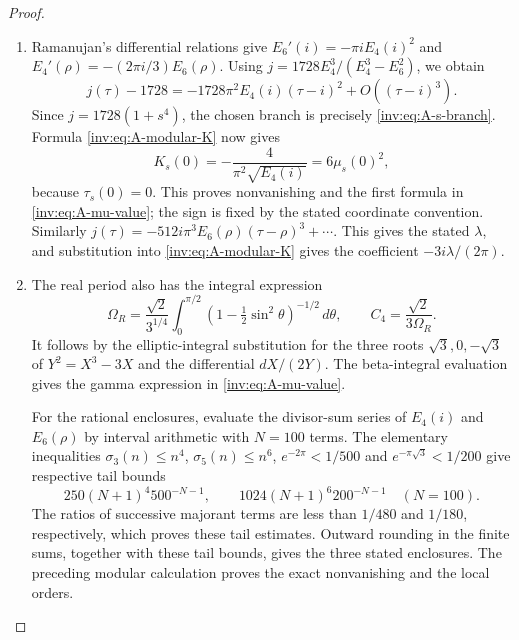 \begin{proof}
\begin{enumerate}[label=\arabic*.,leftmargin=*]
\item Ramanujan's differential relations give
$E_6'(i)=-\pi i E_4(i)^2$ and
$E_4'(\rho)=-(2\pi i/3)E_6(\rho)$.
Using $j=1728E_4^3/(E_4^3-E_6^2)$, we obtain
\[
j(\tau)-1728=-1728\pi^2E_4(i)(\tau-i)^2+O((\tau-i)^3).
\]
Since $j=1728(1+s^4)$, the chosen branch is precisely
\eqref{inv:eq:A-s-branch}.  Formula \eqref{inv:eq:A-modular-K} now gives
\[
K_s(0)=-\frac4{\pi^2\sqrt{E_4(i)}}=6\mu_s(0)^2,
\]
because $\tau_s(0)=0$.  This proves nonvanishing and the first
formula in \eqref{inv:eq:A-mu-value}; the sign is fixed by the stated
coordinate convention.  Similarly
$j(\tau)=-512i\pi^3E_6(\rho)(\tau-\rho)^3+\cdots$.
This gives the stated $\lambda$, and substitution into
\eqref{inv:eq:A-modular-K} gives the coefficient $-3i\lambda/(2\pi)$.

\item The real period also has the integral expression
\[
\Omega_R=\frac{\sqrt2}{3^{1/4}}
\int_0^{\pi/2}(1-\tfrac12\sin^2\theta)^{-1/2}\,d\theta,
\qquad C_4=\frac{\sqrt2}{3\Omega_R}.
\]
It follows by the elliptic-integral substitution for the three roots
$\sqrt3,0,-\sqrt3$ of $Y^2=X^3-3X$ and the differential
$dX/(2Y)$. The beta-integral evaluation gives the gamma expression
in \eqref{inv:eq:A-mu-value}.

For the rational enclosures, evaluate the divisor-sum series of
$E_4(i)$ and $E_6(\rho)$ by interval arithmetic with $N=100$ terms.
The elementary inequalities $\sigma_3(n)\le n^4$,
$\sigma_5(n)\le n^6$, $e^{-2\pi}<1/500$ and
$e^{-\pi\sqrt3}<1/200$ give respective tail bounds
\[
250(N+1)^4 500^{-N-1},\qquad
1024(N+1)^6 200^{-N-1}\quad(N=100).
\]
The ratios of successive majorant terms are less than $1/480$
and $1/180$, respectively, which proves these tail estimates.
Outward rounding in the finite sums, together with these tail bounds,
gives the three stated enclosures. The preceding modular calculation
proves the exact nonvanishing and the local orders.
\end{enumerate}
\end{proof}
